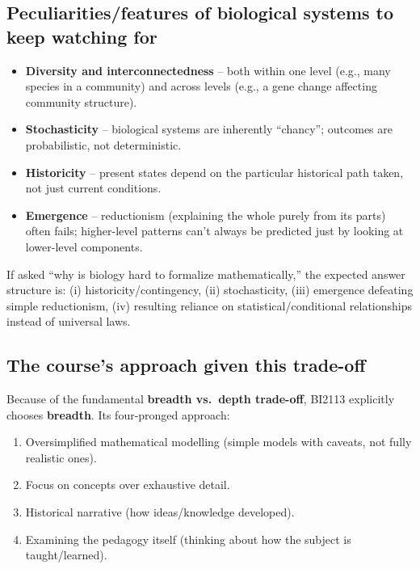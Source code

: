 \documentclass[11pt,a4paper]{article}
\begin{document}
\subsection{Peculiarities/features of biological systems to keep watching for}
\begin{itemize}[leftmargin=1.5em]
\item \textbf{Diversity and interconnectedness} -- both within one level (e.g., many species in a community) and across levels (e.g., a gene change affecting community structure).
\item \textbf{Stochasticity} -- biological systems are inherently ``chancy''; outcomes are probabilistic, not deterministic.
\item \textbf{Historicity} -- present states depend on the particular historical path taken, not just current conditions.
\item \textbf{Emergence} -- reductionism (explaining the whole purely from its parts) often fails; higher-level patterns can't always be predicted just by looking at lower-level components.
\end{itemize}

\begin{exambox}
If asked ``why is biology hard to formalize mathematically,'' the expected answer structure is: (i) historicity/contingency, (ii) stochasticity, (iii) emergence defeating simple reductionism, (iv) resulting reliance on statistical/conditional relationships instead of universal laws.
\end{exambox}

\subsection{The course's approach given this trade-off}
Because of the fundamental \textbf{breadth vs.\ depth trade-off}, BI2113 explicitly chooses \textbf{breadth}. Its four-pronged approach:
\begin{enumerate}[leftmargin=1.5em]
\item Oversimplified mathematical modelling (simple models with caveats, not fully realistic ones).
\item Focus on concepts over exhaustive detail.
\item Historical narrative (how ideas/knowledge developed).
\item Examining the pedagogy itself (thinking about how the subject is taught/learned).
\end{enumerate}
\end{document}

